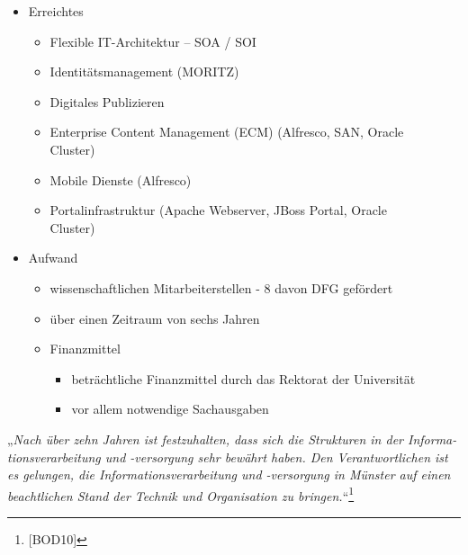 \documentclass[a4paper]{article}
\newcommand\liststyleLSxviii{%
\renewcommand\labelitemi{${\bullet}$}
\renewcommand\labelitemii{${\circ}$}
\renewcommand\labelitemiii{${\blacksquare}$}
\renewcommand\labelitemiv{${\bullet}$}
}
\begin{document}
\liststyleLSxviii
\begin{itemize}
\item {\sffamily
Erreichtes}

\begin{itemize}
\item {\sffamily
Flexible IT-Architektur – SOA / SOI\ \ \ \ }
\item {\sffamily
Identitätsmanagement (MORITZ)\ \ \ \ }
\item {\sffamily
Digitales Publizieren\ \ \ \ }
\item {\sffamily
Enterprise Content Management (ECM) (Alfresco, SAN, Oracle Cluster)\ \ }
\item {\sffamily
Mobile Dienste (Alfresco)\ \ }
\item {\sffamily
Portalinfrastruktur (Apache Webserver, JBoss Portal, Oracle Cluster)\ \ \ \ }
\end{itemize}
\item {\sffamily
Aufwand\ \ }

\begin{itemize}
\item { wissenschaftlichen Mitarbeiterstellen - 8 davon DFG gefördert\ \ }
\item {\sffamily
\"{u}ber einen Zeitraum von sechs Jahren}
\item {\sffamily
Finanzmittel\ \ \ \ }

\begin{itemize}
\item {\sffamily
beträchtliche Finanzmittel durch das Rektorat der Universität}
\item {\sffamily
vor allem notwendige Sachausgaben}
\end{itemize}
\end{itemize}
\end{itemize}

\bigskip

{\sffamily
„\textit{Nach über zehn Jahren ist festzuhalten, dass sich die Strukturen in der Informa- tionsverarbeitung und
-versorgung sehr bewährt haben. Den Verantwortlichen ist es gelungen, die Informationsverarbeitung und -versorgung in
Münster auf einen beachtlichen Stand der Technik und Organisation zu bringen.}“\footnote{[BOD10]}}


\bigskip
\end{document}
